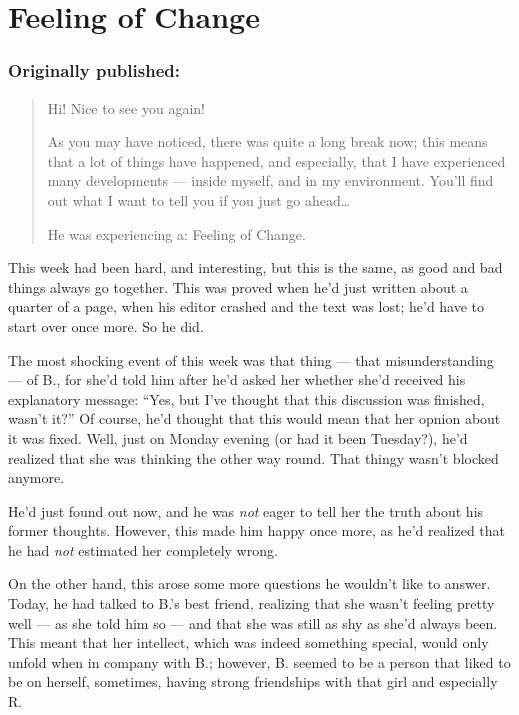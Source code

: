 \chapter{Feeling of Change}
\label{cha:feeling-of-change}
\subsection*{Originally published: }
\begin{quote}
Hi! Nice to see you again!

As you may have noticed, there was quite a long break now; this means that a lot of things have happened, and especially, that I have experienced many developments --- inside myself, and in my environment. You'll find out what I want to tell you if you just go ahead\ldots

He was experiencing a: Feeling of Change.
\end{quote}

This week had been hard, and interesting, but this is the same, as good and bad things always go together. This was proved when he'd just written about a quarter of a page, when his editor crashed and the text was lost; he'd have to start over once more. So he did.

The most shocking event of this week was that thing --- that misunderstanding --- of B., for she'd told him after he'd asked her whether she'd received his explanatory message: \enquote{Yes, but I've thought that this discussion was finished, wasn't it?}
Of course, he'd thought that this would mean that her opnion about it was fixed. 
Well, just on Monday evening (or had it been Tuesday?), he'd realized that she was thinking the other way round. 
That thingy wasn't blocked anymore.

He'd just found out now, and he was \emph{not} eager to tell her the truth about his former thoughts. However, this made him happy once more, as he'd realized that he had \emph{not} estimated her completely wrong.

On the other hand, this arose some more questions he wouldn't like to answer. 
Today, he had talked to B.'s best friend, realizing that she wasn't feeling pretty well --- as she told him so --- and that she was still as shy as she'd always been. This meant that her intellect, which was indeed something special, would only unfold when in company with B.; however, B. seemed to be a person that liked to be on herself, sometimes, having strong friendships with that girl and especially R.

